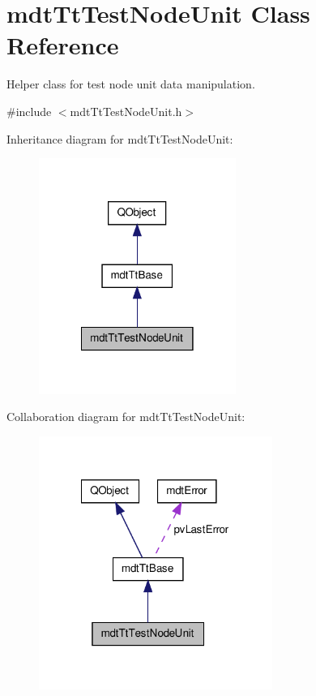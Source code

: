 \hypertarget{classmdt_tt_test_node_unit}{\section{mdt\-Tt\-Test\-Node\-Unit Class Reference}
\label{classmdt_tt_test_node_unit}
}


Helper class for test node unit data manipulation.  




{\ttfamily \#include $<$mdt\-Tt\-Test\-Node\-Unit.\-h$>$}



Inheritance diagram for mdt\-Tt\-Test\-Node\-Unit\-:\nopagebreak
\begin{figure}[H]
\begin{center}
\leavevmode
\includegraphics[width=182pt]{classmdt_tt_test_node_unit__inherit__graph}
\end{center}
\end{figure}


Collaboration diagram for mdt\-Tt\-Test\-Node\-Unit\-:\nopagebreak
\begin{figure}[H]
\begin{center}
\leavevmode
\includegraphics[width=216pt]{classmdt_tt_test_node_unit__coll__graph}
\end{center}
\end{figure}
